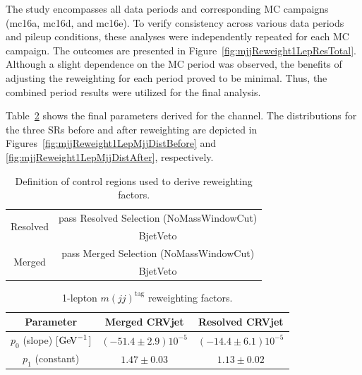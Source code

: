 The study encompasses all data periods and corresponding MC campaigns (mc16a, mc16d, and mc16e). To verify consistency across various data periods and pileup conditions, these analyses were independently repeated for each MC campaign. The outcomes are presented in Figure~\ref{fig:mjjReweight1LepResTotal}. Although a slight dependence on the MC period was observed, the benefits of adjusting the \mjjtag reweighting for each period proved to be minimal. Thus, the combined period results were utilized for the final analysis.

Table~\ref{tab:1lepReweighting} shows the final parameters derived for the \olep channel.
The \mjjtag distributions for the three SRs before and after reweighting are depicted in Figures~\ref{fig:mjjReweight1LepMjjDistBefore} and \ref{fig:mjjReweight1LepMjjDistAfter}, respectively.

\begin{table}[ht]
    \centering
    \caption{Definition of control regions used to derive \Wjets reweighting factors.}
    \begin{tabular}{|c|c|}
        \hline
        \multirow{2}{4em}{Resolved} & pass Resolved Selection (NoMassWindowCut)  \\
         & BjetVeto  \\
         \hline
        \multirow{2}{4em}{Merged} &  pass Merged Selection (NoMassWindowCut) \\
        & BjetVeto  \\
         \hline
    \end{tabular}
    \label{tab:mjjReweight1LepRegions}
\end{table}


\begin{table}[ht]
\centering
\caption{1-lepton $m(jj)^\text{tag}$ reweighting factors.}
\label{tab:1lepReweighting}
\begin{tabular}{ |c|c|c| }
\hline
Parameter & Merged CRVjet & Resolved CRVjet  \\
\hline
$p_{0}$ (slope) [$\text{Ge\kern -0.1em V}^{-1}$] & $(-51.4 \pm 2.9)10^{-5}$ &  $(-14.4 \pm 6.1)10^{-5}$ \\
 \hline
$p_{1}$ (constant)  & $1.47 \pm 0.03$ & $1.13 \pm 0.02$ \\
\hline
\end{tabular}
\end{table}

